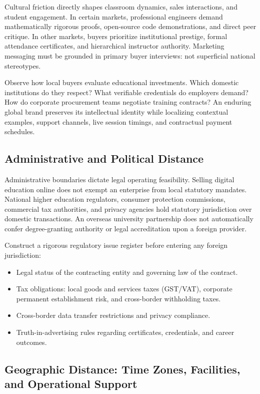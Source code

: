 Cultural friction directly shapes classroom dynamics, sales interactions, and student engagement. In certain markets, professional engineers demand mathematically rigorous proofs, open-source code demonstrations, and direct peer critique. In other markets, buyers prioritize institutional prestige, formal attendance certificates, and hierarchical instructor authority. Marketing messaging must be grounded in primary buyer interviews: not superficial national stereotypes.

Observe how local buyers evaluate educational investments. Which domestic institutions do they respect? What verifiable credentials do employers demand? How do corporate procurement teams negotiate training contracts? An enduring global brand preserves its intellectual identity while localizing contextual examples, support channels, live session timings, and contractual payment schedules.

\subsection{Administrative and Political Distance}
\label{sec:administrative_political_distance}

Administrative boundaries dictate legal operating feasibility. Selling digital education online does not exempt an enterprise from local statutory mandates. National higher education regulators, consumer protection commissions, commercial tax authorities, and privacy agencies hold statutory jurisdiction over domestic transactions. An overseas university partnership does not automatically confer degree-granting authority or legal accreditation upon a foreign provider.

Construct a rigorous regulatory issue register before entering any foreign jurisdiction:
\begin{itemize}
\item Legal status of the contracting entity and governing law of the contract.
\item Tax obligations: local goods and services taxes (GST/VAT), corporate permanent establishment risk, and cross-border withholding taxes.
\item Cross-border data transfer restrictions and privacy compliance.
\item Truth-in-advertising rules regarding certificates, credentials, and career outcomes.
\end{itemize}

\subsection{Geographic Distance: Time Zones, Facilities, and Operational Support}
\label{sec:geographic_distance_time_zones}

